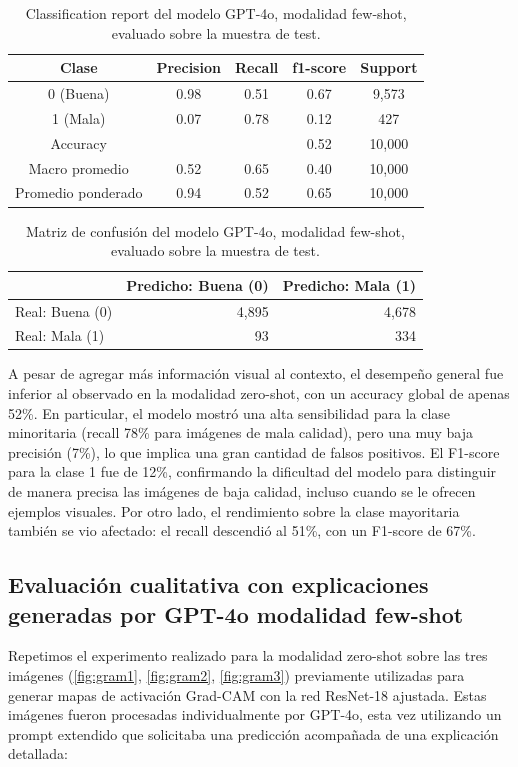 \begin{table}[H]
	\centering
	\renewcommand{\arraystretch}{1.5}
	\begin{tabular}{ ||ccccc||  }
		\hline
		\textbf{Clase} & \textbf{Precision} & \textbf{Recall} & \textbf{f1-score} & \textbf{Support} \\
		\hline
		0 (Buena) & 0.98 & 0.51 & 0.67 & 9,573 \\
		\hline
		1 (Mala) & 0.07 & 0.78 & 0.12 & 427 \\
		\hline
		Accuracy &  &  & 0.52 & 10,000 \\
		\hline
		Macro promedio & 0.52 & 0.65 & 0.40 & 10,000 \\
		\hline
		Promedio ponderado & 0.94 & 0.52 & 0.65 & 10,000 \\
		\hline
	\end{tabular}
	\caption{Classification report del modelo GPT-4o, modalidad few-shot, evaluado sobre la muestra de test.}
	\label{tab:evaluacionFewShot}
\end{table}

\begin{table}[H]
	\centering
	\renewcommand{\arraystretch}{1.5}
	\begin{tabular}{ ||lrr||  }
		\hline
		& \textbf{Predicho: Buena (0)} & \textbf{Predicho: Mala (1)} \\
		\hline
		Real: Buena (0) & 4,895 & 4,678 \\
		\hline
		Real: Mala (1) & 93  & 334 \\
		\hline
	\end{tabular}
	\caption{Matriz de confusión del modelo GPT-4o, modalidad few-shot, evaluado sobre la muestra de test.}
	\label{tab:matrizFewShot}
\end{table}

A pesar de agregar más información visual al contexto, el desempeño general fue inferior al observado en la modalidad zero-shot, con un accuracy global de apenas 52\%. En particular, el modelo mostró una alta sensibilidad para la clase minoritaria (recall 78\% para imágenes de mala calidad), pero una muy baja precisión (7\%), lo que implica una gran cantidad de falsos positivos. El F1-score para la clase 1 fue de 12\%, confirmando la dificultad del modelo para distinguir de manera precisa las imágenes de baja calidad, incluso cuando se le ofrecen ejemplos visuales. Por otro lado, el rendimiento sobre la clase mayoritaria también se vio afectado: el recall descendió al 51\%, con un F1-score de 67\%.

\subsection{Evaluación cualitativa con explicaciones generadas por GPT-4o modalidad few-shot}
Repetimos el experimento realizado para la modalidad zero-shot sobre las tres imágenes (\ref{fig:gram1}, \ref{fig:gram2}, \ref{fig:gram3}) previamente utilizadas para generar mapas de activación Grad-CAM con la red ResNet-18 ajustada. Estas imágenes fueron procesadas individualmente por GPT-4o, esta vez utilizando un prompt extendido que solicitaba una predicción acompañada de una explicación detallada:

